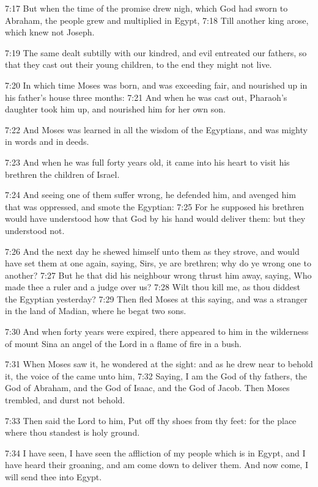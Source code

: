 7:17 But when the time of the promise drew nigh, which God had sworn
to Abraham, the people grew and multiplied in Egypt, 7:18 Till another
king arose, which knew not Joseph.

7:19 The same dealt subtilly with our kindred, and evil entreated our
fathers, so that they cast out their young children, to the end they
might not live.

7:20 In which time Moses was born, and was exceeding fair, and
nourished up in his father's house three months: 7:21 And when he was
cast out, Pharaoh's daughter took him up, and nourished him for her
own son.

7:22 And Moses was learned in all the wisdom of the Egyptians, and was
mighty in words and in deeds.

7:23 And when he was full forty years old, it came into his heart to
visit his brethren the children of Israel.

7:24 And seeing one of them suffer wrong, he defended him, and avenged
him that was oppressed, and smote the Egyptian: 7:25 For he supposed
his brethren would have understood how that God by his hand would
deliver them: but they understood not.

7:26 And the next day he shewed himself unto them as they strove, and
would have set them at one again, saying, Sirs, ye are brethren; why
do ye wrong one to another?  7:27 But he that did his neighbour wrong
thrust him away, saying, Who made thee a ruler and a judge over us?
7:28 Wilt thou kill me, as thou diddest the Egyptian yesterday?  7:29
Then fled Moses at this saying, and was a stranger in the land of
Madian, where he begat two sons.

7:30 And when forty years were expired, there appeared to him in the
wilderness of mount Sina an angel of the Lord in a flame of fire in a
bush.

7:31 When Moses saw it, he wondered at the sight: and as he drew near
to behold it, the voice of the \LORD came unto him, 7:32 Saying, I am
the God of thy fathers, the God of Abraham, and the God of Isaac, and
the God of Jacob. Then Moses trembled, and durst not behold.

7:33 Then said the Lord to him, Put off thy shoes from thy feet: for
the place where thou standest is holy ground.

7:34 I have seen, I have seen the affliction of my people which is in
Egypt, and I have heard their groaning, and am come down to deliver
them. And now come, I will send thee into Egypt.

